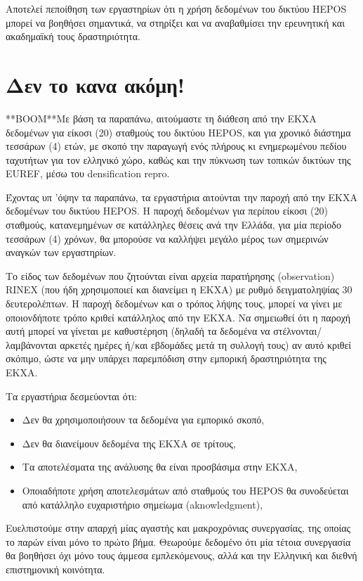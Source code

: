\documentclass[11pt]{article}
\begin{document}
Αποτελεί πεποίθηση των εργαστηρίων ότι η χρήση δεδομένων του δικτύου HEPOS μπορεί να βοηθήσει σημαντικά, να στηρίξει και να αναβαθμίσει την ερευνητική και ακαδημαϊκή τους δραστηριότητα.

\section{Δεν το κανα ακόμη!}
**BOOM**Με βάση τα παραπάνω, αιτούμαστε τη διάθεση από την ΕΚΧΑ δεδομένων για είκοσι (20) σταθμούς του δικτύου HEPOS, και για χρονικό διάστημα τεσσάρων (4) ετών, με σκοπό την παραγωγή ενός πλήρους κι ενημερωμένου πεδίου ταχυτήτων για τον ελληνικό χώρο, καθώς και την πύκνωση των τοπικών δικτύων της EUREF, μέσω του densification repro.

Έχοντας υπ 'όψην τα παραπάνω, τα εργαστήρια αιτούνται την παροχή από την ΕΚΧΑ δεδομένων του δικτύου HEPOS. Η παροχή δεδομένων για περίπου είκοσι (20) σταθμούς, κατανεμημένων σε κατάλληλες θέσεις ανά την Ελλάδα, για μία περίοδο τεσσάρων (4) χρόνων, θα μπορούσε να καλλήψει μεγάλο μέρος των σημερινών αναγκών των εργαστηρίων.

Το είδος των δεδομένων που ζητούνται είναι αρχεία παρατήρησης (observation) RINEX (που ήδη χρησιμοποιεί και διανείμει η ΕΚΧΑ) με ρυθμό δειγματοληψίας 30 δευτερολέπτων. Η παροχή δεδομένων και ο τρόπος λήψης τους, μπορεί να γίνει με οποιονδήποτε τρόπο κριθεί κατάλληλος από την ΕΚΧΑ. Να σημειωθεί ότι η παροχή αυτή μπορεί να γίνεται με καθυστέρηση (δηλαδή τα δεδομένα να στέλνονται/λαμβάνονται αρκετές ημέρες ή/και εβδομάδες μετά τη συλλογή τους) αν αυτό κριθεί σκόπιμο, ώστε να μην υπάρχει παρεμπόδιση στην εμπορική δραστηριότητα της ΕΚΧΑ.

Τα εργαστήρια δεσμεύονται ότι:
\begin{itemize}
\item Δεν θα χρησιμοποιήσουν τα δεδομένα για εμπορικό σκοπό,
\item Δεν θα διανείμουν δεδομένα της ΕΚΧΑ σε τρίτους,
\item Τα αποτελέσματα της ανάλυσης θα είναι προσβάσιμα στην ΕΚΧΑ,
\item Οποιαδήποτε χρήση αποτελεσμάτων από σταθμούς του HEPOS θα συνοδεύεται από κατάλληλο ευχαριστήριο σημείωμα (aknowledgment),
\end{itemize}

Ευελπιστούμε στην απαρχή μίας αγαστής και μακροχρόνιας συνεργασίας, της οποίας το παρών είναι μόνο το πρώτο βήμα. Θεωρούμε δεδομένο ότι μία τέτοια συνεργασία θα βοηθήσει όχι μόνο τους άμμεσα εμπλεκόμενους, αλλά και την Ελληνική και διεθνή επιστημονική κοινότητα.




\end{document}
